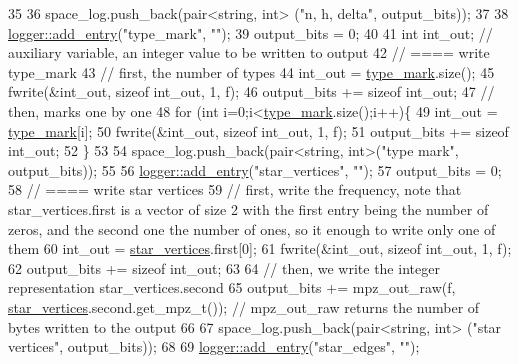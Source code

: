 \begin{DoxyCode}
35 
36   space\_log.push\_back(pair<string, int> (\textcolor{stringliteral}{"n, h, delta"}, output\_bits));
37 
38   \hyperlink{classlogger_a710163deb17bc81f70d53d285b8ac9ac}{logger::add\_entry}(\textcolor{stringliteral}{"type\_mark"}, \textcolor{stringliteral}{""});
39   output\_bits = 0;
40 
41   \textcolor{keywordtype}{int} int\_out; \textcolor{comment}{// auxiliary variable, an integer value to be written to output}
42   \textcolor{comment}{// ==== write type\_mark}
43   \textcolor{comment}{// first, the number of types}
44   int\_out = \hyperlink{classmarked__graph__compressed_a86b00223525703e973415cbc9c94da68}{type\_mark}.size();
45   fwrite(&int\_out, \textcolor{keyword}{sizeof} int\_out, 1, f);
46   output\_bits += \textcolor{keyword}{sizeof} int\_out;
47   \textcolor{comment}{// then, marks one by one}
48   \textcolor{keywordflow}{for} (\textcolor{keywordtype}{int} i=0;i<\hyperlink{classmarked__graph__compressed_a86b00223525703e973415cbc9c94da68}{type\_mark}.size();i++)\{
49     int\_out = \hyperlink{classmarked__graph__compressed_a86b00223525703e973415cbc9c94da68}{type\_mark}[i];
50     fwrite(&int\_out, \textcolor{keyword}{sizeof} int\_out, 1, f);
51     output\_bits += \textcolor{keyword}{sizeof} int\_out;
52   \}
53 
54   space\_log.push\_back(pair<string, int>(\textcolor{stringliteral}{"type mark"}, output\_bits));
55 
56   \hyperlink{classlogger_a710163deb17bc81f70d53d285b8ac9ac}{logger::add\_entry}(\textcolor{stringliteral}{"star\_vertices"}, \textcolor{stringliteral}{""});
57   output\_bits = 0;
58   \textcolor{comment}{// ==== write star vertices}
59   \textcolor{comment}{// first, write the frequency, note that star\_vertices.first is a vector of size 2 with the first entry
       being the number of zeros, and the second one the number of ones, so it enough to write only one of them}
60   int\_out = \hyperlink{classmarked__graph__compressed_a7a4ced4586e2e353f9076bd447df5208}{star\_vertices}.first[0];
61   fwrite(&int\_out, \textcolor{keyword}{sizeof} int\_out, 1, f);
62   output\_bits += \textcolor{keyword}{sizeof} int\_out;
63 
64   \textcolor{comment}{// then, we write the integer representation star\_vertices.second}
65   output\_bits +=  mpz\_out\_raw(f, \hyperlink{classmarked__graph__compressed_a7a4ced4586e2e353f9076bd447df5208}{star\_vertices}.second.get\_mpz\_t()); \textcolor{comment}{// mpz\_out\_raw returns the
       number of bytes written to the output}
66 
67   space\_log.push\_back(pair<string, int> (\textcolor{stringliteral}{"star vertices"}, output\_bits));
68 
69   \hyperlink{classlogger_a710163deb17bc81f70d53d285b8ac9ac}{logger::add\_entry}(\textcolor{stringliteral}{"star\_edges"}, \textcolor{stringliteral}{""});

\end{DoxyCode}
